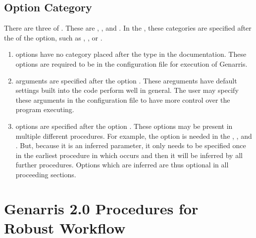 \documentclass[letterpaper,10pt,english]{sphinxmanual}
\begin{document}
\section{Option Category}
\label{\detokenize{index:option-category}}\label{\detokenize{index:category}}
There are three  of . These are ,
, and . In the , these categories
are specified after the  of the option, such as , , or .
\begin{enumerate}
\def\theenumi{\arabic{enumi}}
\def\labelenumi{\theenumi .}
\makeatletter\def\p@enumii{\p@enumi \theenumi .}\makeatother
\item {} 
 options have no category placed after the type in the
documentation. These options are required to be in the configuration
file for execution of Genarris.

\item {} 
 arguments are specified after the option .
These areguments have default settings built into the code perform
well in general. The user may specify these  arguments
in the configuration file to have more control over the program
executing.

\item {} 
 options are specified after the option . These options
may be present in multiple different procedures. For example, the option
 is needed in the ,
, and .
But, because it is an inferred parameter, it only needs to be specified
once in the earliest procedure in which occurs and then it will be
inferred by all further procedures. Options which are inferred are thus
optional in all proceeding sections.

\end{enumerate}


\chapter{Genarris 2.0 Procedures for Robust Workflow}
\label{\detokenize{index:genarris-2-0-procedures-for-robust-workflow}}
\end{document}
